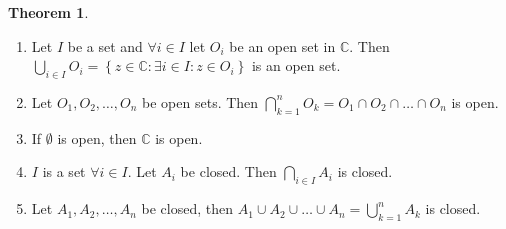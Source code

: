 \documentclass[a4paper,landscape,twocolumn]{article}
\theoremstyle{definition}
\newtheorem{theorem}{Theorem}
\newcommand\set[1]{\left\{#1\right\}}
\begin{document}
\begin{theorem}
  \begin{enumerate}
    \item
      Let $I$ be a set and $\forall i \in I$ let $O_i$ be an open set in $\mathbb C$.
      Then $\bigcup_{i \in I} O_i = \set{z \in \mathbb C: \exists i \in I: z \in O_i}$
      is an open set.
    \item
      Let $O_1, O_2, \ldots, O_n$ be open sets.
      Then $\bigcap_{k=1}^n O_k = O_1 \cap O_2 \cap \ldots \cap O_n$ is open.
    \item
      If $\emptyset$ is open, then $\mathbb C$ is open.
    \item
      $I$ is a set $\forall i \in I$. Let $A_i$ be closed.
      Then $\bigcap_{i\in I} A_i$ is closed.
    \item
      Let $A_1, A_2, \dots, A_n$ be closed, then
      $A_1 \cup A_2 \cup \dots \cup A_n = \bigcup_{k=1}^n A_k$ is closed.
  \end{enumerate}
\end{theorem}
\end{document}
